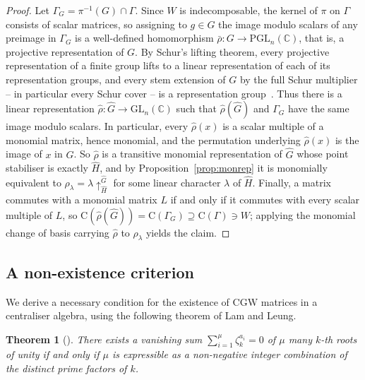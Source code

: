 \documentclass{article}
\newtheorem{theorem}{Theorem}[section]
\theoremstyle{definition}
\theoremstyle{remark}
\newcommand{\Cr}{\mathrm{C}}
\newcommand{\CGW}{\mathrm{CGW}}
\newcommand{\myuparrow}{\!\uparrow}
\begin{document}
\begin{proof}
Let $\Gamma_G = \pi^{-1}(G) \cap \Gamma$.  Since $W$ is indecomposable, the
kernel of $\pi$ on $\Gamma$ consists of scalar matrices, so assigning to
$g \in G$ the image modulo scalars of any preimage in $\Gamma_G$ is a
well-defined homomorphism
$\bar{\rho} \colon G \rightarrow \mathrm{PGL}_n(\mathbb{C})$, that is, a
projective representation of $G$.  By Schur's lifting theorem, every
projective representation of a finite group lifts to a linear
representation of each of its representation groups, and every stem
extension of $G$ by the full Schur multiplier -- in particular every Schur
cover -- is a representation group~\cite{Karpilovsky}.  Thus there is a
linear representation
$\widehat{\rho} \colon \widehat{G} \rightarrow \mathrm{GL}_n(\mathbb{C})$
such that $\widehat{\rho}(\widehat{G})$ and $\Gamma_G$ have the same image
modulo scalars.  In particular, every $\widehat{\rho}(x)$ is a scalar
multiple of a monomial matrix, hence monomial, and the permutation
underlying $\widehat{\rho}(x)$ is the image of $x$ in $G$.  So
$\widehat{\rho}$ is a transitive monomial representation of $\widehat{G}$
whose point stabiliser is exactly $\widehat{H}$, and by
Proposition~\ref{prop:monrep} it is monomially equivalent to
$\rho_\lambda = \lambda \myuparrow_{\widehat{H}}^{\widehat{G}}$ for some
linear character $\lambda$ of $\widehat{H}$.  Finally, a matrix commutes
with a monomial matrix $L$ if and only if it commutes with every scalar
multiple of $L$, so
$\Cr(\widehat{\rho}(\widehat{G})) = \Cr(\Gamma_G) \supseteq \Cr(\Gamma) \ni W$;
applying the monomial change of basis carrying $\widehat{\rho}$ to
$\rho_\lambda$ yields the claim.
\end{proof}



\subsection{A non-existence criterion}\label{sec:lam-leung}

We derive a necessary condition for the existence of $\CGW$ matrices in a centraliser
algebra, using the following theorem of Lam and Leung.

\begin{theorem}[{\cite[Theorem~1.2]{LamLeung}}]\label{thm:lam-leung}
There exists a vanishing sum $\sum_{i=1}^{\mu} \zeta_k^{a_i} = 0$ of $\mu$ many
$k$-th roots of unity if and only if $\mu$ is expressible as a non-negative integer
combination of the distinct prime factors of $k$.
\end{theorem}
\end{document}
